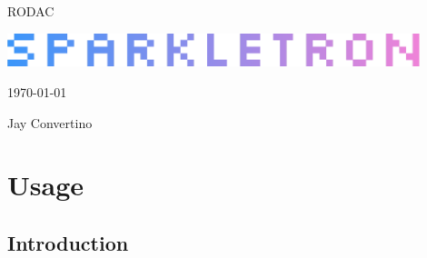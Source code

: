 \documentclass{article}
\begin{document}
  \begin{titlepage}
    \begin{center}

    {\Huge RODAC}

    \vspace{25mm}

    \includegraphics[width=0.90\textwidth,height=\textheight,keepaspectratio]{src/img/SPARKLETRON.png}

    \vspace{25mm}

    \today

    \vspace{15mm}

    {\Large Jay Convertino}

    \end{center}
  \end{titlepage}

  \tableofcontents

  \newpage

  \section{Usage}

  \subsection{Introduction}
\end{document}
